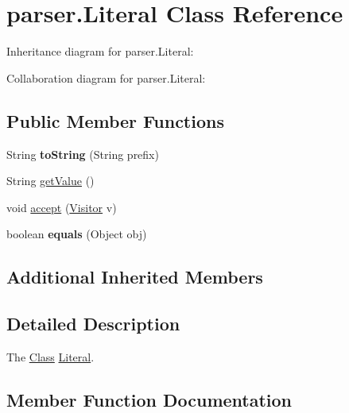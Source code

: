 \hypertarget{classparser_1_1_literal}{}\section{parser.\+Literal Class Reference}
\label{classparser_1_1_literal}


Inheritance diagram for parser.\+Literal\+:


Collaboration diagram for parser.\+Literal\+:
\subsection*{Public Member Functions}
\begin{DoxyCompactItemize}
\item 
String {\bfseries to\+String} (String prefix)\hypertarget{classparser_1_1_literal_a6f93bb40e836eb74030e99e81c2a1b57}{}\label{classparser_1_1_literal_a6f93bb40e836eb74030e99e81c2a1b57}

\item 
String \hyperlink{classparser_1_1_literal_a9fce56c26c44683c5f8d01c9c5b426ca}{get\+Value} ()
\item 
void \hyperlink{classparser_1_1_literal_a4d3c10be1a3b8dadda1082075aae32bd}{accept} (\hyperlink{interfacemain_1_1_visitor}{Visitor} v)
\item 
boolean {\bfseries equals} (Object obj)\hypertarget{classparser_1_1_literal_a488fc6939790500e5d90ddc5f4058cb9}{}\label{classparser_1_1_literal_a488fc6939790500e5d90ddc5f4058cb9}

\end{DoxyCompactItemize}
\subsection*{Additional Inherited Members}


\subsection{Detailed Description}
The \hyperlink{classparser_1_1_class}{Class} \hyperlink{classparser_1_1_literal}{Literal}. 

\subsection{Member Function Documentation}
